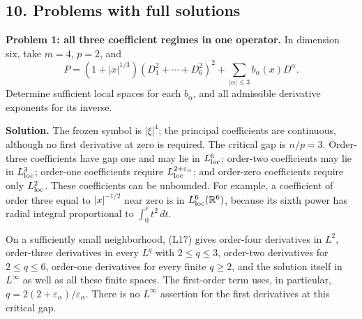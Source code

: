 \documentclass[
  11pt,
]{article}
\makeatletter
\let\ReaderOriginalAnchorStart\hyper@anchorstart
\let\ReaderOriginalAnchorEnd\hyper@anchorend
\let\ReaderPendingAliases\@empty
\def\ReaderArmAliases#1{\gdef\ReaderPendingAliases{#1}}
\def\hyper@anchorstart#1{\ReaderIfNativeAnchorTF{#1}{\ReaderPendingAliases\global\let\ReaderPendingAliases\@empty}{}\ReaderOriginalAnchorStart{#1}}
\makeatother
\begin{document}
\ReaderArmAliases{\ReaderOriginalAnchorStart{AN03-LPS-001}\ReaderOriginalAnchorEnd\begingroup\expandafter\def\csname @currentHref\endcsname{AN03-LPS-001}\label{AN03-LPS-001}\endgroup\ReaderOriginalAnchorStart{an03-lps-001-problems-with-full-solutions}\ReaderOriginalAnchorEnd\begingroup\expandafter\def\csname @currentHref\endcsname{an03-lps-001-problems-with-full-solutions}\label{an03-lps-001-problems-with-full-solutions}\endgroup\ReaderOriginalAnchorStart{10-problems-with-full-solutions}\ReaderOriginalAnchorEnd\begingroup\expandafter\def\csname @currentHref\endcsname{10-problems-with-full-solutions}\label{10-problems-with-full-solutions}\endgroup\ReaderOriginalAnchorStart{problems-with-full-solutions}\ReaderOriginalAnchorEnd}
\subsection{10. Problems with full
solutions}\label{problems-with-full-solutions}

\textbf{Problem 1: all three coefficient regimes in one operator.} In
dimension six, take \(m=4\), \(p=2\), and \[
P=(1+|x|^{1/3})(D_1^2+\cdots+D_6^2)^2
  +\sum_{|\alpha|\leq3}b_\alpha(x)D^\alpha.
\] Determine sufficient local spaces for each \(b_\alpha\), and all
admissible derivative exponents for its inverse.

\textbf{Solution.} The frozen symbol is \(|\xi|^4\); the principal
coefficients are continuous, although no first derivative at zero is
required. The critical gap is \(n/p=3\). Order-three coefficients have
gap one and may lie in \(L^6_{\rm loc}\); order-two coefficients may lie
in \(L^3_{\rm loc}\); order-one coefficients require
\(L^{2+\varepsilon_\alpha}_{\rm loc}\); and order-zero coefficients
require only \(L^2_{\rm loc}\). These coefficients can be unbounded. For
example, a coefficient of order three equal to \(|x|^{-1/2}\) near zero
is in \(L^6_{\rm loc}(\mathbb R^6)\), because its sixth power has radial
integral proportional to \(\int_0^r t^2\,dt\).

On a sufficiently small neighborhood, (L17) gives order-four derivatives
in \(L^2\), order-three derivatives in every \(L^q\) with
\(2\leq q\leq3\), order-two derivatives for \(2\leq q\leq6\), order-one
derivatives for every finite \(q\geq2\), and the solution itself in
\(L^\infty\) as well as all these finite spaces. The first-order term
uses, in particular, \(q=2(2+\varepsilon_\alpha)/\varepsilon_\alpha\).
There is no \(L^\infty\) assertion for the first derivatives at this
critical gap.
\end{document}
